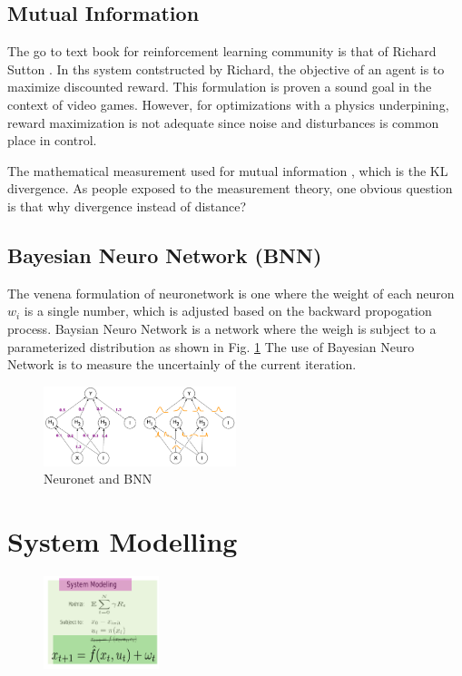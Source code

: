\documentclass[journal]{IEEEtran}
\begin{document}
\subsection{Mutual Information}
The go to text book for reinforcement learning community is that of Richard Sutton \cite{Sutton1998IntroductionTR}. In ths system contstructed by Richard, the objective of an agent is to maximize discounted reward. This formulation is proven a sound goal in the context of video games. However, for optimizations with a physics underpining, reward maximization is not adequate since noise and disturbances is common place in control.

The mathematical measurement used for mutual information \cite{Kullback1951ONIA}, which is the KL divergence. As people exposed to the measurement theory, one obvious question is that why divergence instead of distance?

\subsection{Bayesian Neuro Network (BNN)}

The venena formulation of neuronetwork is one where the weight of each neuron $w_i$ is a single number, which is adjusted based on the backward propogation process. Baysian Neuro Network is a network where the weigh is subject to a parameterized distribution as shown in Fig. \ref{fig:2} The use of Bayesian Neuro Network is to measure the uncertainly of the current iteration.
\begin{figure}[H]
    \centering
    \includegraphics[width=0.5\textwidth]{bnn.png}
    \caption{Neuronet and BNN}
    \label{fig:2}
\end{figure}

\section{System Modelling}
\begin{figure}[H]
    \centering
    \includegraphics[width=0.3\textwidth]{Control1.png}
\end{figure}
\end{document}
